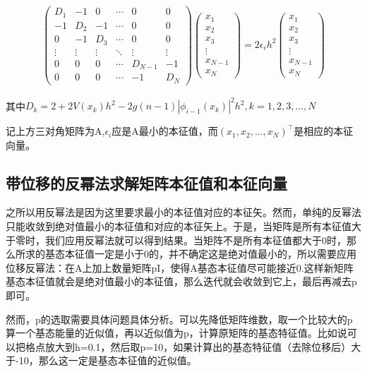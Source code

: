 \documentclass[10pt, a4paper]{article}
\begin{document}
    \begin{align*}
      \begin{pmatrix}
        D_1&-1&0&\cdots&0&0\\
        -1& D_2&-1&\cdots&0&0\\
        0&-1&D_3&\cdots&0&0\\
        \vdots&\vdots&\vdots&\ddots&\vdots&\vdots\\
        0&0&0&\cdots& D_{N-1}&-1\\
        0&0&0&\cdots&-1&D_N
      \end{pmatrix}
      \begin{pmatrix}
        x_1\\
        x_2\\
        x_3\\
        \vdots\\
        x_{N-1}\\
        x_N
      \end{pmatrix}=
      2\epsilon_ih^2
      \begin{pmatrix}
        x_1\\
        x_2\\
        x_3\\
        \vdots\\
        x_{N-1}\\
        x_N
      \end{pmatrix}
    \end{align*}

    其中$D_k=2+2V(x_k)h^2-2g(n-1)|\phi_{i-1}(x_k)|^2h^2,k=1,2,3,...,N$

    记上方三对角矩阵为A,$\epsilon_i$应是A最小的本征值，而$(x_1,x_2,...,x_N)^\top$是相应的本征向量。

    \subsection{带位移的反幂法求解矩阵本征值和本征向量}

    之所以用反幂法是因为这里要求最小的本征值对应的本征矢。然而，单纯的反幂法只能收敛到绝对值最小的本征值和对应的本征矢上。于是，当矩阵是所有本征值大于零时，我们应用反幂法就可以得到结果。当矩阵不是所有本征值都大于0时，那么所求的基态本征值一定是小于0的，并不确定这是绝对值最小的，所以需要应用位移反幂法：在A上加上数量矩阵pI，使得A基态本征值尽可能接近0.这样新矩阵基态本征值就会是绝对值最小的本征值，那么迭代就会收敛到它上，最后再减去p即可。

    然而，p的选取需要具体问题具体分析。可以先降低矩阵维数，取一个比较大的p算一个基态能量的近似值，再以近似值为p，计算原矩阵的基态特征值。比如说可以把格点放大到h=0.1，然后取p=10，如果计算出的基态特征值（去除位移后）大于-10，那么这一定是基态本征值的近似值。
\end{document}
